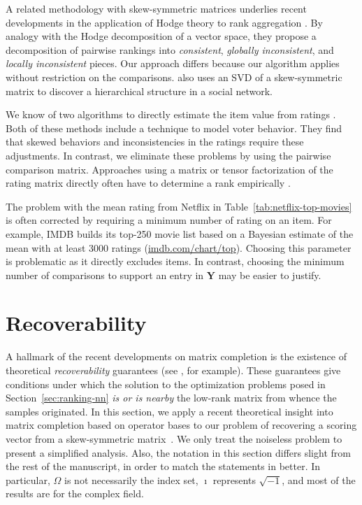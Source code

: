 \documentclass{sig-alternate}
\renewcommand{\cite}{\citep}
\newcommand{\mat}{\boldsymbol}
\providecommand{\mY}{\ensuremath{\mat{Y}}}
\begin{document}
A related methodology with skew-symmetric matrices
underlies recent developments in the 
application of Hodge theory to rank aggregation
 \cite{Jiang-2010-Hodge}.
By analogy with the Hodge decomposition of a vector space,
they propose a decomposition of pairwise rankings into
\emph{consistent}, \emph{globally inconsistent}, and \emph{locally inconsistent}
pieces. Our approach differs because our algorithm applies
without restriction on the comparisons.  
\citet{Freeman-1997-hierarchies} also uses an SVD of
a skew-symmetric matrix to discover a hierarchical
structure in a social network.

We know of two algorithms to directly estimate the item
value from ratings
\cite{dekerchov2007-dynamical-reputation,ho2008-ratings}.
Both of these methods include a technique to
model voter behavior.  They find that skewed
behaviors and inconsistencies in the ratings
require these adjustments.  In contrast, we
eliminate these problems by using the pairwise
comparison matrix.  Approaches
using a matrix or tensor factorization of
the rating matrix directly often have to
determine a rank empirically
\cite{Rendel2009-learning-rankings}.

The problem with the mean rating from Netflix
in Table~\ref{tab:netflix-top-movies}
is often corrected by requiring a minimum
number of rating on an item.  For example,
IMDB builds its top-250 movie list based
on a Bayesian estimate of the mean with at
least $3000$ ratings (\url{imdb.com/chart/top}).
Choosing this parameter is problematic as it
directly excludes items.
In contrast, choosing the minimum number of
comparisons to support an entry in $\mY$
may be easier to justify.

\section{Recoverability} \label{sec:recoverability}

A hallmark of the recent developments on matrix completion
is the existence of theoretical \emph{recoverability} guarantees
(see \citet{candes2009-exact-completion}, for example).
These guarantees give conditions under which the solution to
the optimization problems posed in Section~\ref{sec:ranking-nn}
\emph{is or is nearby} the low-rank matrix from whence the
samples originated.  In this section, we apply a recent theoretical
insight into matrix completion based on operator bases to
our problem of recovering a scoring vector from a skew-symmetric
matrix~\cite{Gross2010-low-rank}. We only treat the noiseless
problem to present a simplified analysis.  Also, the notation in
this section differs slight from the rest of the manuscript, 
in order to match the statements in \citet{Gross2010-low-rank} 
better.  In particular, $\Omega$ is not necessarily the 
index set, $\imath$ represents $\sqrt{-1}$, and
most of the results are for the complex field.
\end{document}
